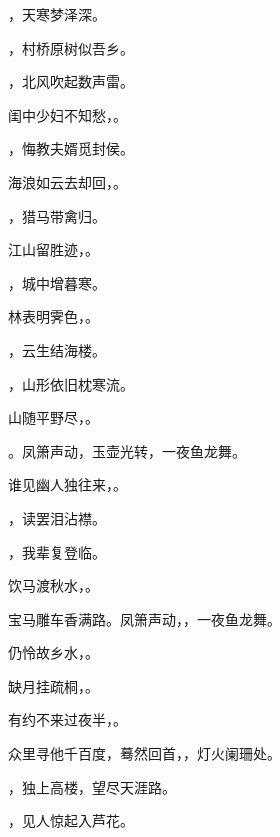 \documentclass[12pt, a4paper, addpoints]{exam}
\begin{document}
\begin{questions}
\question[2] \uline{\qquad\qquad\qquad\qquad}，天寒梦泽深。

\question[2] \uline{\qquad\qquad\qquad\qquad}，村桥原树似吾乡。

\question[2] \uline{\qquad\qquad\qquad\qquad}，北风吹起数声雷。

\question[2] 闺中少妇不知愁，\uline{\qquad\qquad\qquad\qquad}。

\question[2] \uline{\qquad\qquad\qquad\qquad}，悔教夫婿觅封侯。

\question[2] 海浪如云去却回，\uline{\qquad\qquad\qquad\qquad}。

\question[2] \uline{\qquad\qquad\qquad\qquad}，猎马带禽归。

\question[2] 江山留胜迹，\uline{\qquad\qquad\qquad\qquad}。

\question[2] \uline{\qquad\qquad\qquad\qquad}，城中增暮寒。

\question[2] 林表明霁色，\uline{\qquad\qquad\qquad\qquad}。

\question[2] \uline{\qquad\qquad\qquad\qquad}，云生结海楼。

\question[2] \uline{\qquad\qquad\qquad\qquad}，山形依旧枕寒流。

\question[2] 山随平野尽，\uline{\qquad\qquad\qquad\qquad}。

\question[2] \uline{\qquad\qquad\qquad\qquad}。凤箫声动，玉壶光转，一夜鱼龙舞。

\question[2] 谁见幽人独往来，\uline{\qquad\qquad\qquad\qquad}。

\question[2] \uline{\qquad\qquad\qquad\qquad}，读罢泪沾襟。

\question[2] \uline{\qquad\qquad\qquad\qquad}，我辈复登临。

\question[2] 饮马渡秋水，\uline{\qquad\qquad\qquad\qquad}。

\question[2] 宝马雕车香满路。凤箫声动，\uline{\qquad\qquad\qquad\qquad}，一夜鱼龙舞。

\question[2] 仍怜故乡水，\uline{\qquad\qquad\qquad\qquad}。

\question[2] 缺月挂疏桐，\uline{\qquad\qquad\qquad\qquad}。

\question[2] 有约不来过夜半，\uline{\qquad\qquad\qquad\qquad}。

\question[2] 众里寻他千百度，蓦然回首，\uline{\qquad\qquad\qquad\qquad}，灯火阑珊处。

\question[2] \uline{\qquad\qquad\qquad\qquad}，独上高楼，望尽天涯路。

\question[2] \uline{\qquad\qquad\qquad\qquad}，见人惊起入芦花。

\end{questions}
\end{document}

